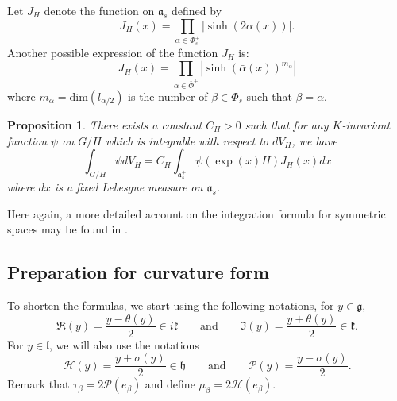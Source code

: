 \documentclass{amsart}
\newtheorem{prop}[thm]{Proposition}
\theoremstyle{definition}
\begin{document}
Let $J_H$ denote the function on $\mathfrak{a}_s$ defined by 
\[
J_H(x) = \prod_{\alpha \in \Phi_s^+} |\sinh(2\alpha(x))|.  
\]
Another possible expression of the function $J_H$ is:
\[
J_H(x) = \prod_{\bar{\alpha} \in \bar{\Phi}^+} |\sinh(\bar{\alpha}(x))^{m_{\bar{\alpha}}}|
\]
where $m_{\bar{\alpha}} = \mathrm{dim}(\bar{l}_{\bar{\alpha}/2})$ is the 
number of $\beta \in \Phi_s$ such that $\bar{\beta}=\bar{\alpha}$. 

\begin{prop}
\label{prop_integration_horosymmetric_space}
There exists a constant $C_H>0$ such that
for any $K$-invariant function $\psi$ on $G/H$ which is integrable with respect to 
$dV_H$, we have 
\[
\int_{G/H} \psi dV_H = C_H \int_{\mathfrak{a}_s^+} \psi(\exp(x)H) J_H(x) dx
\] 
where $dx$ is a fixed Lebesgue measure on $\mathfrak{a}_s$.
\end{prop} 

Here again, a more detailed account on the integration formula for 
symmetric spaces may be found in \cite[Section 3]{vdB05}.

\subsection{Preparation for curvature form}

To shorten the formulas, we start using the following notations, 
for $y\in \mathfrak{g}$, 
\[
\Re(y)=\frac{y-\theta(y)}{2}\in i\mathfrak{k}
\qquad \mathrm{and} \qquad
\Im(y)=\frac{y+\theta(y)}{2}\in \mathfrak{k}.
\]
For $y\in \mathfrak{l}$, we will also use the notations 
\[
\mathcal{H}(y)=\frac{y+\sigma(y)}{2}\in \mathfrak{h}
\qquad \mathrm{and} \qquad
\mathcal{P}(y)=\frac{y-\sigma(y)}{2}.
\]
Remark that $\tau_{\beta}=2\mathcal{P}(e_{\beta})$ and define 
$\mu_{\beta}=2\mathcal{H}(e_{\beta})$.
\end{document}

